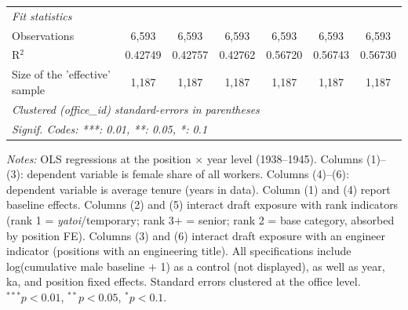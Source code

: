 \begin{table}[htbp]
\begin{threeparttable}
\begin{tabular}{lcccccc}
   \midrule
   \emph{Fit statistics}\\
   Observations                   & 6,593    & 6,593          & 6,593          & 6,593           & 6,593           & 6,593\\  
   R$^2$                          & 0.42749  & 0.42757        & 0.42762        & 0.56720         & 0.56743         & 0.56730\\  
   Size of the 'effective' sample & 1,187    & 1,187          & 1,187          & 1,187           & 1,187           & 1,187\\  
   \midrule \midrule
   \multicolumn{7}{l}{\emph{Clustered (office\_id) standard-errors in parentheses}}\\
   \multicolumn{7}{l}{\emph{Signif. Codes: ***: 0.01, **: 0.05, *: 0.1}}\\
\end{tabular}
\begin{tablenotes}[flushleft]
\footnotesize
\item \textit{Notes:} OLS regressions at the position $\times$ year level (1938--1945). Columns (1)--(3): dependent variable is female share of all workers. Columns (4)--(6): dependent variable is average tenure (years in data). Column (1) and (4) report baseline effects. Columns (2) and (5) interact draft exposure with rank indicators (rank 1 = \emph{yatoi}/temporary; rank 3+ = senior; rank 2 = base category, absorbed by position FE). Columns (3) and (6) interact draft exposure with an engineer indicator (positions with an engineering title). All specifications include log(cumulative male baseline $+$ 1) as a control (not displayed), as well as year, ka, and position fixed effects. Standard errors clustered at the office level. $^{***}p<0.01$, $^{**}p<0.05$, $^{*}p<0.1$.
\end{tablenotes}
\end{threeparttable}
\end{table}
